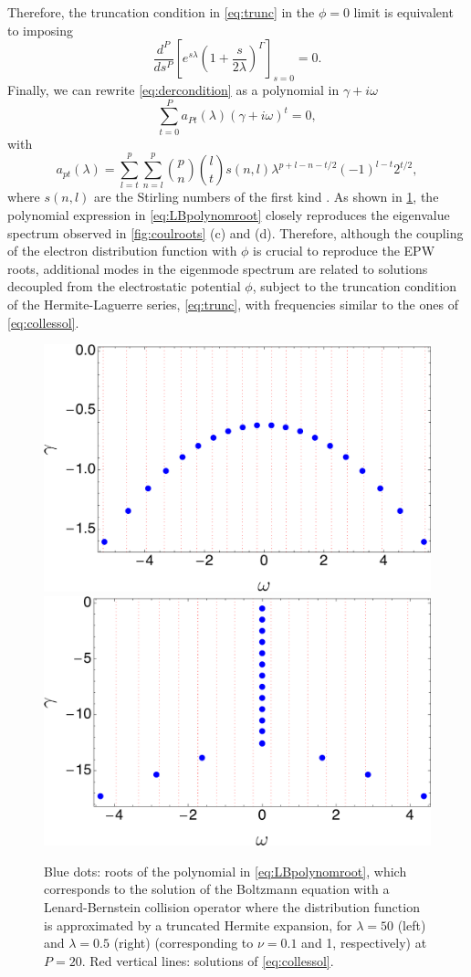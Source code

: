 %
Therefore, the truncation condition in \cref{eq:trunc} in the $\phi=0$ limit is equivalent to imposing
%
\begin{equation}
    \frac{d^P}{d s^P}\left[e^{s \lambda}\left(1+\frac{s}{2\lambda}\right)^\Gamma\right]_{s=0}=0.
\label{eq:dercondition}
\end{equation}
%
Finally, we can rewrite \cref{eq:dercondition} as a polynomial in $\gamma+i\omega$
%
\begin{equation}
    \sum_{t=0}^P a_{Pt}(\lambda) (\gamma+i\omega)^t=0,
\label{eq:LBpolynomroot}
\end{equation}
%
with
%
\begin{equation}
    a_{pt}(\lambda) = \sum_{l=t}^p\sum_{n=l}^p \binom{p}{n}\binom{l}{t}s(n,l)\lambda^{p+l-n-t/2}(-1)^{l-t}2^{t/2},
\end{equation}
%
where $s(n,l)$ are the Stirling numbers of the first kind \citep{Moser1958,Qi2014}.
%
As shown in \cref{fig:closedFormLBzeros}, the polynomial expression in \cref{eq:LBpolynomroot} closely reproduces the eigenvalue spectrum observed in \cref{fig:coulroots} (c) and (d).
%
Therefore, although the coupling of the electron distribution function with $\phi$ is crucial to reproduce the EPW roots, additional modes in the eigenmode spectrum are related to solutions decoupled from the electrostatic potential $\phi$, subject to the truncation condition of the Hermite-Laguerre series, \cref{eq:trunc}, with frequencies similar to the ones of \cref{eq:collessol}.

%
\begin{figure}
    \centering
    \includegraphics[width=.49\textwidth]{images/closedFormLBzeros_lambda10_p20-eps-converted-to.pdf}
    \includegraphics[width=.49\textwidth]{images/closedFormLBzeros_lambda4_p20-eps-converted-to.pdf}
    \caption{{Blue dots:} roots of the polynomial in \cref{eq:LBpolynomroot}, which corresponds to the solution of the Boltzmann equation with a Lenard-Bernstein collision operator where the distribution function is approximated by a truncated Hermite expansion, for $\lambda=50$ (left) and $\lambda=0.5$ (right) {(corresponding to $\nu=0.1$ and 1, respectively)} at $P=20$. {Red vertical lines: solutions of \cref{eq:collessol}.}}
    \label{fig:closedFormLBzeros}
\end{figure}


